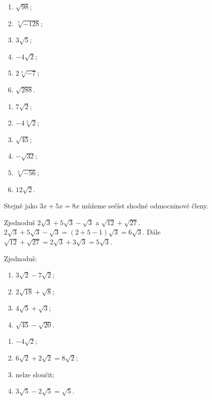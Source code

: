 \documentclass[11pt,a4paper]{article}
\begin{document}
\begin{zadaniReseniBox}[title={Samostatná práce 2},breakable=false]
\begin{enumerate}[label=\alph*)]
\item $\sqrt{98}$; \item $\sqrt[3]{-128}$;
\item $3\sqrt5$; \item $-4\sqrt2$;
\item $2\sqrt[3]{-7}$; \item $\sqrt{288}$.
\end{enumerate}
\tcblower
\begin{enumerate}[label=\alph*)]
\item $7\sqrt2$; \item $-4\sqrt[3]2$; \item $\sqrt{45}$;
\item $-\sqrt{32}$; \item $\sqrt[3]{-56}$; \item $12\sqrt2$.
\end{enumerate}
\end{zadaniReseniBox}

Stejně jako $3x+5x=8x$ můžeme sečíst shodné odmocninové členy.
\begin{prikladReseniBox}[title={Příklad 3},breakable=false]
Zjednoduš $2\sqrt3+5\sqrt3-\sqrt3$ a $\sqrt{12}+\sqrt{27}$.
\tcblower
$2\sqrt3+5\sqrt3-\sqrt3=(2+5-1)\sqrt3=6\sqrt3$.
Dále $\sqrt{12}+\sqrt{27}=2\sqrt3+3\sqrt3=5\sqrt3$.
\end{prikladReseniBox}
\begin{zadaniReseniBox}[title={Samostatná práce 3},breakable=false]
Zjednoduš:
\begin{enumerate}[label=\alph*)]
\item $3\sqrt2-7\sqrt2$; \item $2\sqrt{18}+\sqrt8$;
\item $4\sqrt5+\sqrt3$; \item $\sqrt{45}-\sqrt{20}$.
\end{enumerate}
\tcblower
\begin{enumerate}[label=\alph*)]
\item $-4\sqrt2$; \item $6\sqrt2+2\sqrt2=8\sqrt2$;
\item nelze sloučit; \item $3\sqrt5-2\sqrt5=\sqrt5$.
\end{enumerate}
\end{zadaniReseniBox}
\end{document}
